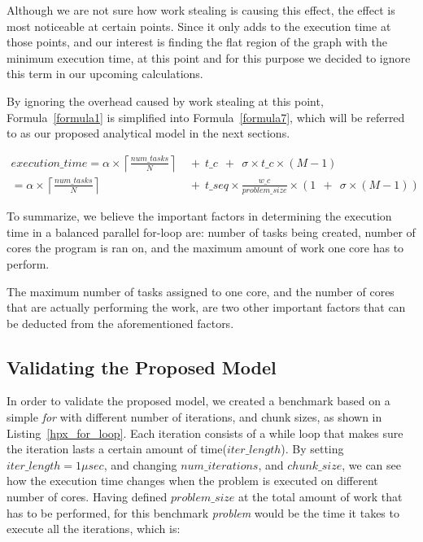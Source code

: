 Although we are not sure how work stealing is causing this effect, the effect is most  noticeable at certain points. Since it only adds to the execution time at those points, and our interest is finding the flat region of the graph with the minimum execution time, at this point and for this purpose we decided to ignore this term in our upcoming calculations. 

By ignoring the overhead caused by work stealing at this point, Formula~\ref{formula1} is simplified into Formula~\ref{formula7}, which will be referred to as our proposed analytical model in the next sections. 

\begin{equation}\label{formula7}
\begin{aligned}
execution\_time = 
\alpha\times{\left\lceil{\frac{num\_{tasks}}{N}}\right\rceil}\:\:&+\:\:t\_c\:\:+\:\:\sigma\times{t\_c}\times{(M-1)}\\
=\alpha\times{\left\lceil{\frac{num\_{tasks}}{N}}\right\rceil}\:\:&+\:\:t\_{seq}\times{\frac{w\_c}{problem\_{size}}}\times{(1\:\:+\:\:\sigma\times{(M-1)})}
\end{aligned}
\end{equation}

To summarize, we believe the important factors in determining the execution time in a balanced parallel for-loop are: number of tasks being created, number of cores the program is ran on, and the maximum amount of work one core has to perform. 

The maximum number of tasks assigned to one core, and the number of cores that are actually performing the work, are two other important factors that can be deducted from the aforementioned factors. 


\vspace{\baselineskip}
\subsection{Validating the Proposed Model}
In order to validate the proposed model, we created a benchmark based on a simple \textit{for} with different number of iterations, and chunk sizes, as shown in Listing~\ref{hpx_for_loop}. 
Each iteration consists of a while loop that makes sure the iteration lasts a certain amount of time($iter\_{length}$). By setting $iter\_{length}=1\mu{sec}$, and changing $num\_{iterations}$, and $chunk\_{size}$, we can see how the execution time changes when the problem is executed on different number of cores. Having defined $problem\_{size}$ at the total amount of work that has to be performed, for this benchmark \textit{problem} would be the time it takes to execute all the iterations, which is:

